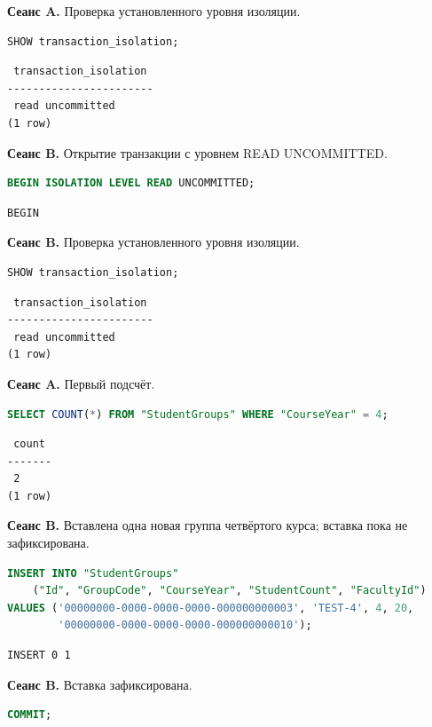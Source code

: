 \documentclass[12pt,a4paper]{article}
\begin{document}
\textbf{Сеанс A.} Проверка установленного уровня изоляции.
\begin{lstlisting}[language=SQL]
SHOW transaction_isolation;
\end{lstlisting}

\begin{lstlisting}
 transaction_isolation
-----------------------
 read uncommitted
(1 row)
\end{lstlisting}

\textbf{Сеанс B.} Открытие транзакции с уровнем READ UNCOMMITTED.
\begin{lstlisting}[language=SQL]
BEGIN ISOLATION LEVEL READ UNCOMMITTED;
\end{lstlisting}

\begin{lstlisting}
BEGIN
\end{lstlisting}

\textbf{Сеанс B.} Проверка установленного уровня изоляции.
\begin{lstlisting}[language=SQL]
SHOW transaction_isolation;
\end{lstlisting}

\begin{lstlisting}
 transaction_isolation
-----------------------
 read uncommitted
(1 row)
\end{lstlisting}

\textbf{Сеанс A.} Первый подсчёт.
\begin{lstlisting}[language=SQL]
SELECT COUNT(*) FROM "StudentGroups" WHERE "CourseYear" = 4;
\end{lstlisting}

\begin{lstlisting}
 count
-------
 2
(1 row)
\end{lstlisting}

\textbf{Сеанс B.} Вставлена одна новая группа четвёртого курса; вставка пока не зафиксирована.
\begin{lstlisting}[language=SQL]
INSERT INTO "StudentGroups"
    ("Id", "GroupCode", "CourseYear", "StudentCount", "FacultyId")
VALUES ('00000000-0000-0000-0000-000000000003', 'TEST-4', 4, 20,
        '00000000-0000-0000-0000-000000000010');
\end{lstlisting}

\begin{lstlisting}
INSERT 0 1
\end{lstlisting}

\textbf{Сеанс B.} Вставка зафиксирована.
\begin{lstlisting}[language=SQL]
COMMIT;
\end{lstlisting}
\end{document}
